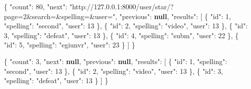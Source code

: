 \documentclass[
]{article}
\newenvironment{Shaded}{}{}
\newcommand{\DataTypeTok}[1]{\textcolor[rgb]{0.56,0.13,0.00}{#1}}
\newcommand{\DecValTok}[1]{\textcolor[rgb]{0.25,0.63,0.44}{#1}}
\newcommand{\FunctionTok}[1]{\textcolor[rgb]{0.02,0.16,0.49}{#1}}
\newcommand{\KeywordTok}[1]{\textcolor[rgb]{0.00,0.44,0.13}{\textbf{#1}}}
\newcommand{\OtherTok}[1]{\textcolor[rgb]{0.00,0.44,0.13}{#1}}
\newcommand{\StringTok}[1]{\textcolor[rgb]{0.25,0.44,0.63}{#1}}
\begin{document}
\begin{Shaded}
\begin{Highlighting}[]
\FunctionTok{\{}
  \DataTypeTok{"count"}\FunctionTok{:} \DecValTok{80}\FunctionTok{,}
  \DataTypeTok{"next"}\FunctionTok{:} \StringTok{"http://127.0.0.1:8000/user/star/?page=2\&search=\&spelling=\&user="}\FunctionTok{,}
  \DataTypeTok{"previous"}\FunctionTok{:} \KeywordTok{null}\FunctionTok{,}
  \DataTypeTok{"results"}\FunctionTok{:} \OtherTok{[}
    \FunctionTok{\{}
      \DataTypeTok{"id"}\FunctionTok{:} \DecValTok{1}\FunctionTok{,}
      \DataTypeTok{"spelling"}\FunctionTok{:} \StringTok{"second"}\FunctionTok{,}
      \DataTypeTok{"user"}\FunctionTok{:} \DecValTok{13}
    \FunctionTok{\}}\OtherTok{,}
    \FunctionTok{\{}
      \DataTypeTok{"id"}\FunctionTok{:} \DecValTok{2}\FunctionTok{,}
      \DataTypeTok{"spelling"}\FunctionTok{:} \StringTok{"video"}\FunctionTok{,}
      \DataTypeTok{"user"}\FunctionTok{:} \DecValTok{13}
    \FunctionTok{\}}\OtherTok{,}
    \FunctionTok{\{}
      \DataTypeTok{"id"}\FunctionTok{:} \DecValTok{3}\FunctionTok{,}
      \DataTypeTok{"spelling"}\FunctionTok{:} \StringTok{"defeat"}\FunctionTok{,}
      \DataTypeTok{"user"}\FunctionTok{:} \DecValTok{13}
    \FunctionTok{\}}\OtherTok{,}
    \FunctionTok{\{}
      \DataTypeTok{"id"}\FunctionTok{:} \DecValTok{4}\FunctionTok{,}
      \DataTypeTok{"spelling"}\FunctionTok{:} \StringTok{"subm"}\FunctionTok{,}
      \DataTypeTok{"user"}\FunctionTok{:} \DecValTok{22}
    \FunctionTok{\}}\OtherTok{,}
    \FunctionTok{\{}
      \DataTypeTok{"id"}\FunctionTok{:} \DecValTok{5}\FunctionTok{,}
      \DataTypeTok{"spelling"}\FunctionTok{:} \StringTok{"egiunvr"}\FunctionTok{,}
      \DataTypeTok{"user"}\FunctionTok{:} \DecValTok{23}
    \FunctionTok{\}}
  \OtherTok{]}
\FunctionTok{\}}
\end{Highlighting}
\end{Shaded}

\begin{Shaded}
\begin{Highlighting}[]
\FunctionTok{\{}
  \DataTypeTok{"count"}\FunctionTok{:} \DecValTok{3}\FunctionTok{,}
  \DataTypeTok{"next"}\FunctionTok{:} \KeywordTok{null}\FunctionTok{,}
  \DataTypeTok{"previous"}\FunctionTok{:} \KeywordTok{null}\FunctionTok{,}
  \DataTypeTok{"results"}\FunctionTok{:} \OtherTok{[}
    \FunctionTok{\{}
      \DataTypeTok{"id"}\FunctionTok{:} \DecValTok{1}\FunctionTok{,}
      \DataTypeTok{"spelling"}\FunctionTok{:} \StringTok{"second"}\FunctionTok{,}
      \DataTypeTok{"user"}\FunctionTok{:} \DecValTok{13}
    \FunctionTok{\}}\OtherTok{,}
    \FunctionTok{\{}
      \DataTypeTok{"id"}\FunctionTok{:} \DecValTok{2}\FunctionTok{,}
      \DataTypeTok{"spelling"}\FunctionTok{:} \StringTok{"video"}\FunctionTok{,}
      \DataTypeTok{"user"}\FunctionTok{:} \DecValTok{13}
    \FunctionTok{\}}\OtherTok{,}
    \FunctionTok{\{}
      \DataTypeTok{"id"}\FunctionTok{:} \DecValTok{3}\FunctionTok{,}
      \DataTypeTok{"spelling"}\FunctionTok{:} \StringTok{"defeat"}\FunctionTok{,}
      \DataTypeTok{"user"}\FunctionTok{:} \DecValTok{13}
    \FunctionTok{\}}
  \OtherTok{]}
\FunctionTok{\}}
\end{Highlighting}
\end{Shaded}
\end{document}
